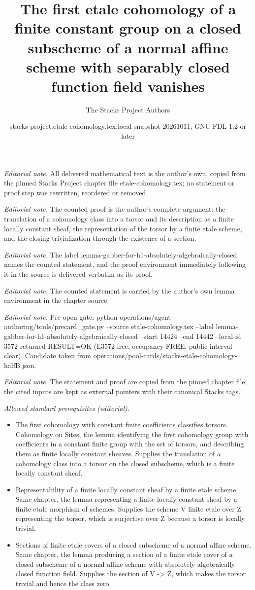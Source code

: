 \documentclass[10pt,a4paper]{amsart}
\title{The first etale cohomology of a finite constant group on a closed subscheme of a normal affine scheme with separably closed function field vanishes}
\author{The Stacks Project Authors}
\date{stacks-project:etale-cohomology.tex:local-snapshot-20261011; GNU FDL 1.2 or later}
\theoremstyle{plain}
\theoremstyle{definition}
\theoremstyle{remark}
\numberwithin{equation}{subsection}
\begin{document}
\maketitle
\noindent\textit{Editorial note.} All delivered mathematical text is the author's own, copied from the pinned Stacks Project chapter file etale-cohomology.tex; no statement or proof step was rewritten, reordered or removed.\par\medskip
\noindent\textit{Editorial note.} The counted proof is the author's complete argument: the translation of a cohomology class into a torsor and its description as a finite locally constant sheaf, the representation of the torsor by a finite etale scheme, and the closing trivialization through the existence of a section.\par\medskip
\noindent\textit{Editorial note.} The label lemma-gabber-for-h1-absolutely-algebraically-closed names the counted statement, and the proof environment immediately following it in the source is delivered verbatim as its proof.\par\medskip
\noindent\textit{Editorial note.} The counted statement is carried by the author's own lemma environment in the chapter source.\par\medskip
\noindent\textit{Editorial note.} Pre-open gate: python operations/agent-authoring/tools/precard\_gate.py --source etale-cohomology.tex --label lemma-gabber-for-h1-absolutely-algebraically-closed --start 14424 --end 14442 --local-id 3572 returned RESULT=OK (L3572 free, occupancy FREE, public interval clear). Candidate taken from operations/pool-cards/stacks-etale-cohomology-halfB.json.\par\medskip
\noindent\textit{Editorial note.} The statement and proof are copied from the pinned chapter file; the cited inputs are kept as external pointers with their canonical Stacks tags.\par\medskip
\noindent\textit{Allowed standard prerequisites (editorial).}\begin{itemize}
\item The first cohomology with constant finite coefficients classifies torsors. Cohomology on Sites, the lemma identifying the first cohomology group with coefficients in a constant finite group with the set of torsors, and describing them as finite locally constant sheaves. Supplies the translation of a cohomology class into a torsor on the closed subscheme, which is a finite locally constant sheaf.
\item Representability of a finite locally constant sheaf by a finite etale scheme. Same chapter, the lemma representing a finite locally constant sheaf by a finite etale morphism of schemes. Supplies the scheme V finite etale over Z representing the torsor, which is surjective over Z because a torsor is locally trivial.
\item Sections of finite etale covers of a closed subscheme of a normal affine scheme. Same chapter, the lemma producing a section of a finite etale cover of a closed subscheme of a normal affine scheme with absolutely algebraically closed function field. Supplies the section of V -> Z, which makes the torsor trivial and hence the class zero.
\end{itemize}\medskip
\end{document}

